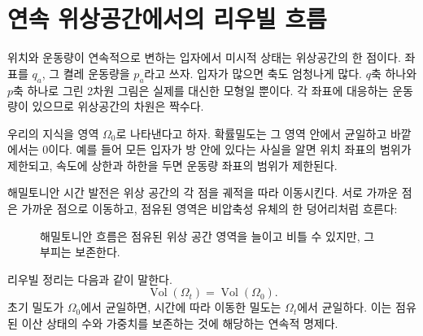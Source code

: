 \begin{classroomqa}
\end{classroomqa}

\section{연속 위상공간에서의 리우빌 흐름}

위치와 운동량이 연속적으로 변하는 입자에서 미시적 상태는 위상공간의 한 점이다. 좌표를 \(q_a\), 그 켤레 운동량을 \(p_a\)라고 쓰자. 입자가 많으면 축도 엄청나게 많다. \(q\)축 하나와 \(p\)축 하나로 그린 2차원 그림은 실제를 대신한 모형일 뿐이다. 각 좌표에 대응하는 운동량이 있으므로 위상공간의 차원은 짝수다.

우리의 지식을 영역 \(\Omega_0\)로 나타낸다고 하자. 확률밀도는 그 영역 안에서 균일하고 바깥에서는 0이다. 예를 들어 모든 입자가 방 안에 있다는 사실을 알면 위치 좌표의 범위가 제한되고, 속도에 상한과 하한을 두면 운동량 좌표의 범위가 제한된다.

해밀토니안 시간 발전은 위상 공간의 각 점을 궤적을 따라 이동시킨다. 서로 가까운 점은 가까운 점으로 이동하고, 점유된 영역은 비압축성 유체의 한 덩어리처럼 흐른다:
\begin{figure}[htbp]
\centering
{}
\caption{해밀토니안 흐름은 점유된 위상 공간 영역을 늘이고 비틀 수 있지만, 그 부피는 보존한다.}
\label{fig:sm1-liouville-flow}
\end{figure}

리우빌 정리는 다음과 같이 말한다.
\begin{equation}
 \operatorname{Vol}(\Omega_t)
 =
 \operatorname{Vol}(\Omega_0).
 \label{eq:sm1-liouville-volume}
\end{equation}
초기 밀도가 \(\Omega_0\)에서 균일하면, 시간에 따라 이동한 밀도는 \(\Omega_t\)에서 균일하다. 이는 점유된 이산 상태의 수와 가중치를 보존하는 것에 해당하는 연속적 명제다.

